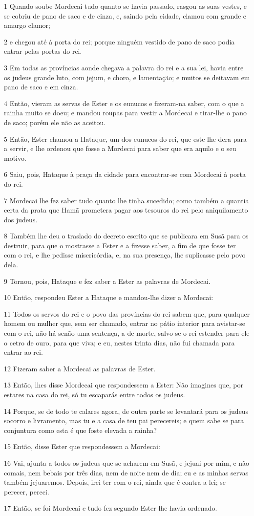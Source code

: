 \par 1 Quando soube Mordecai tudo quanto se havia passado, rasgou as suas vestes, e se cobriu de pano de saco e de cinza, e, saindo pela cidade, clamou com grande e amargo clamor;
\par 2 e chegou até à porta do rei; porque ninguém vestido de pano de saco podia entrar pelas portas do rei.
\par 3 Em todas as províncias aonde chegava a palavra do rei e a sua lei, havia entre os judeus grande luto, com jejum, e choro, e lamentação; e muitos se deitavam em pano de saco e em cinza.
\par 4 Então, vieram as servas de Ester e os eunucos e fizeram-na saber, com o que a rainha muito se doeu; e mandou roupas para vestir a Mordecai e tirar-lhe o pano de saco; porém ele não as aceitou.
\par 5 Então, Ester chamou a Hataque, um dos eunucos do rei, que este lhe dera para a servir, e lhe ordenou que fosse a Mordecai para saber que era aquilo e o seu motivo.
\par 6 Saiu, pois, Hataque à praça da cidade para encontrar-se com Mordecai à porta do rei.
\par 7 Mordecai lhe fez saber tudo quanto lhe tinha sucedido; como também a quantia certa da prata que Hamã prometera pagar aos tesouros do rei pelo aniquilamento dos judeus.
\par 8 Também lhe deu o traslado do decreto escrito que se publicara em Susã para os destruir, para que o mostrasse a Ester e a fizesse saber, a fim de que fosse ter com o rei, e lhe pedisse misericórdia, e, na sua presença, lhe suplicasse pelo povo dela.
\par 9 Tornou, pois, Hataque e fez saber a Ester as palavras de Mordecai.
\par 10 Então, respondeu Ester a Hataque e mandou-lhe dizer a Mordecai:
\par 11 Todos os servos do rei e o povo das províncias do rei sabem que, para qualquer homem ou mulher que, sem ser chamado, entrar no pátio interior para avistar-se com o rei, não há senão uma sentença, a de morte, salvo se o rei estender para ele o cetro de ouro, para que viva; e eu, nestes trinta dias, não fui chamada para entrar ao rei.
\par 12 Fizeram saber a Mordecai as palavras de Ester.
\par 13 Então, lhes disse Mordecai que respondessem a Ester: Não imagines que, por estares na casa do rei, só tu escaparás entre todos os judeus.
\par 14 Porque, se de todo te calares agora, de outra parte se levantará para os judeus socorro e livramento, mas tu e a casa de teu pai perecereis; e quem sabe se para conjuntura como esta é que foste elevada a rainha?
\par 15 Então, disse Ester que respondessem a Mordecai:
\par 16 Vai, ajunta a todos os judeus que se acharem em Susã, e jejuai por mim, e não comais, nem bebais por três dias, nem de noite nem de dia; eu e as minhas servas também jejuaremos. Depois, irei ter com o rei, ainda que é contra a lei; se perecer, pereci.
\par 17 Então, se foi Mordecai e tudo fez segundo Ester lhe havia ordenado.

